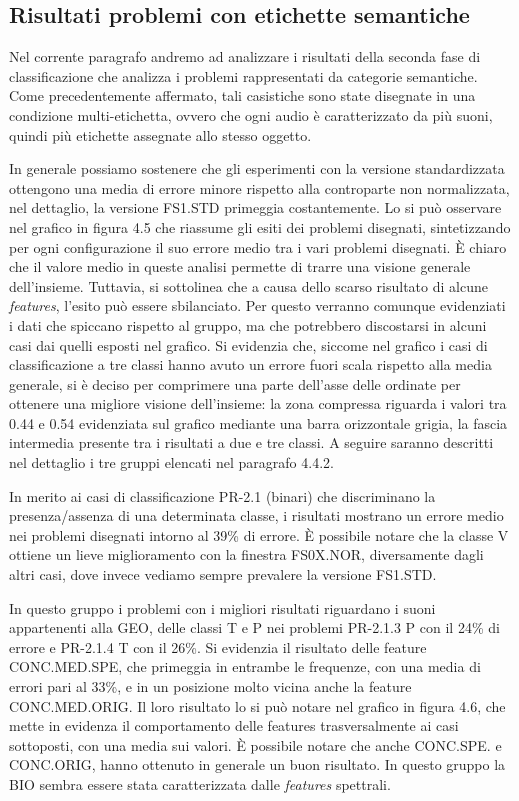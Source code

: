 \cleardoublepage
\subsection{Risultati problemi con etichette semantiche}
Nel corrente paragrafo andremo ad analizzare i risultati della seconda fase di classificazione
che analizza i problemi rappresentati da categorie semantiche. Come precedentemente
affermato, tali casistiche sono state disegnate in una condizione multi-etichetta, ovvero che
ogni audio è caratterizzato da più suoni, quindi più etichette assegnate allo stesso oggetto.

In generale possiamo sostenere che gli esperimenti con la versione standardizzata ottengono
una media di errore minore rispetto alla controparte non normalizzata, nel dettaglio, la
versione FS1.STD primeggia costantemente. Lo si può osservare nel grafico in figura 4.5 che riassume
gli esiti dei problemi disegnati, sintetizzando per ogni configurazione il suo errore medio tra i
vari problemi disegnati. È chiaro che il valore medio in queste analisi permette di trarre una
visione generale dell’insieme. Tuttavia, si sottolinea che a causa dello scarso risultato di
alcune \textit{features}, l’esito può essere sbilanciato. Per questo verranno comunque evidenziati i
dati che spiccano rispetto al gruppo, ma che potrebbero discostarsi in alcuni casi dai quelli
esposti nel grafico. Si evidenzia che, siccome nel grafico i casi di classificazione a tre classi
hanno avuto un errore fuori scala rispetto alla media generale, si è deciso per comprimere una
parte dell’asse delle ordinate per ottenere una migliore visione dell’insieme: la zona
compressa riguarda i valori tra 0.44 e 0.54 evidenziata sul grafico mediante una barra
orizzontale grigia, la fascia intermedia presente tra i risultati a due e tre classi.
A seguire saranno descritti nel dettaglio i tre gruppi elencati nel paragrafo 4.4.2.

In merito ai casi di classificazione PR-2.1 (binari) che discriminano la presenza/assenza di
una determinata classe, i risultati mostrano un errore medio nei problemi disegnati intorno al
39\% di errore. È possibile notare che la classe V ottiene un lieve miglioramento con la
finestra FS0X.NOR, diversamente dagli altri casi, dove invece vediamo sempre prevalere la
versione FS1.STD.

In questo gruppo i problemi con i migliori risultati riguardano i suoni appartenenti alla GEO,
delle classi T e P nei problemi PR-2.1.3 P con il 24\% di errore e PR-2.1.4 T con il 26\%. Si
evidenzia il risultato delle feature CONC.MED.SPE, che primeggia in entrambe le frequenze,
con una media di errori pari al 33\%, e in un posizione molto vicina anche la feature
CONC.MED.ORIG. Il loro risultato lo si può notare nel grafico in figura 4.6, che mette in evidenza il
comportamento delle features trasversalmente ai casi sottoposti, con una media sui valori. È
possibile notare che anche CONC.SPE. e CONC.ORIG, hanno ottenuto in generale un buon
risultato. In questo gruppo la BIO sembra essere stata caratterizzata dalle \textit{features} spettrali.

